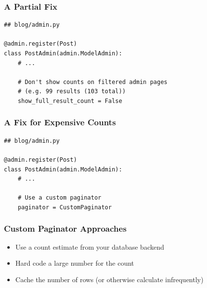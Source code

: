 \documentclass[aspectratio=169]{beamer}
\begin{document}
\begin{frame}
  \begin{figure}[p]
    \centering

    \vfill

  \end{figure}
\end{frame}


\begin{frame}[fragile]
\frametitle{A Partial Fix}
{\tiny
\begin{verbatim}
## blog/admin.py

@admin.register(Post)
class PostAdmin(admin.ModelAdmin):
    # ...

    # Don't show counts on filtered admin pages
    # (e.g. 99 results (103 total))
    show_full_result_count = False
\end{verbatim}
}
\end{frame}


\begin{frame}[fragile]
\frametitle{A Fix for Expensive Counts}
{\tiny
\begin{verbatim}
## blog/admin.py

@admin.register(Post)
class PostAdmin(admin.ModelAdmin):
    # ...

    # Use a custom paginator
    paginator = CustomPaginator
\end{verbatim}
}
\end{frame}


\begin{frame}
\frametitle{Custom Paginator Approaches}
  \begin{itemize}
    \item {\small Use a count estimate from your database backend}
    \item {\small Hard code a large number for the count}
    \item {\small Cache the number of rows (or otherwise calculate infrequently)}
  \end{itemize}
\end{frame}
\end{document}
